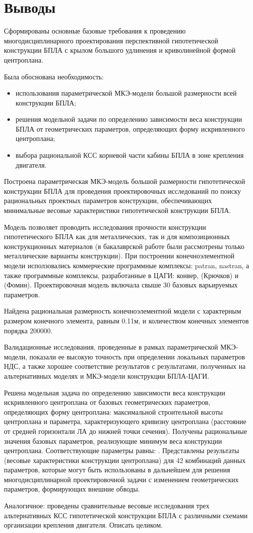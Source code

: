 \chapter*{Выводы}

Сформированы основные базовые требования к проведению многодисциплинарного проектирования перспективной гипотетической конструкции БПЛА с крылом большого удлинения и криволинейной формой центроплана. 

Была обоснована необходимость:
\begin{itemize}
\item использования параметрической МКЭ-модели большой размерности всей конструкции БПЛА;
\item решения модельной задачи по определению зависимости веса конструкции БПЛА от геометрических параметров, определяющих форму искривленного центроплана;
\item выбора рациональной КСС корневой части кабины БПЛА в зоне крепления двигателя.
\end{itemize}

Построена параметрическая МКЭ-модель большой размерности гипотетической конструкции БПЛА для проведения проектировочных исследований по поиску рациональных проектных параметров конструкции, обеспечивающих минимальные весовые характеристики гипотетической конструкции БПЛА. 

Модель позволяет проводить исследования прочности конструкции гипотетического БПЛА как для металлических, так и для композиционных конструкционных материалов (в бакалаврской работе были рассмотрены только металлические варианты конструкции). При построении конечноэлементной модели исползовались коммерческие программные комплексы: patran, nastran, а также программные комплексы, разработанные в ЦАГИ: конвер, (Крючков) и (Фомин).
Проектировочная модель  включала свыше 30 базовых варьируемых параметров. 

Найдена рациональная размерность конечноэлементной модели с характерным размером конечного элемента, равным 0.11м, и количеством конечных элементов порядка $200000$. 

Валидационные исследования, проведенные в рамках параметрической МКЭ-модели, показали ее высокую точность при определении локальных параметров НДС, а также хорошее соответствие результатов с результатами, полученных на альтернативных моделях и МКЭ-модели конструкции БПЛА-ЦАГИ. 


Решена модельная задача по определению зависимости веса конструкции искривленного центроплана от базовых геометрических параметров, определяющих форму центроплана: максимальной строительной высоты центроплана и параметра, характеризующего кривизну центроплана (расстояние от средней горизонтали ЛА до нижней точки сечения). Получены рациональные значения базовых параметров, реализующие минимум веса конструкции центроплана. Соответствующие параметры равны: . Представлены результаты (весовые характеристики конструкции центроплана) для 42 комбинаций данных параметров, которые могут быть использованы в дальнейшем для решения многодисциплинарной проектировочной задачи с изменением геометрических параметров, формирующих внешние обводы. 

Аналогичное: проведены сравнительные весовые исследования трех альтернативных КСС гипотетической конструкции БПЛА с различными схемами организации крепления двигателя. Описать целиком. 